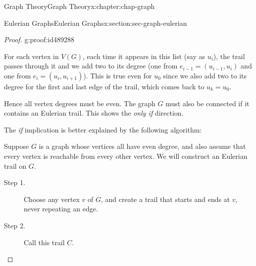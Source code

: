 \documentclass[oneside,10pt,]{book}
\numberwithin{equation}{section}
\begin{document}
\begin{chapterptx}{Graph Theory}{}{Graph Theory}{}{}{x:chapter:chap-graph}
\begin{sectionptx}{Eulerian Graphs}{}{Eulerian Graphs}{}{}{x:section:sec-graph-eulerian}
\begin{proof}{}{g:proof:id489288}
\begin{sidebyside}{1}{0.275}{0.275}{0}
\begin{sbspanel}{0.45}
{
}%
\end{sbspanel}%
\end{sidebyside}%
\par
For each vertex in \(V(G)\), each time it appears in this list (say as \(u_i\)), the trail passes through it and we add two to its degree (one from \(e_{i-1} = (u_{i-1},u_i)\) and one from \(e_i = (u_i,u_{i+1})\)). This is true even for \(u_0\) since we also add two to its degree for the first and last edge of the trail, which comes back to \(u_k = u_0\).%
\par
Hence all vertex degrees must be even. The graph \(G\) must also be connected if it contains an Eulerian trail. This shows the \emph{only if} direction.%
\par
The \emph{if} implication is better explained by the following algorithm:%
\par
Suppose \(G\) is a graph whose vertices all have even degree, and also assume that every vertex is reachable from every other vertex. We will construct an Eulerian trail on \(G\).%
\par
%
\begin{description}
\item[{Step 1.}]Choose any vertex \(v\) of \(G\), and create a trail that starts and ends at \(v\), never repeating an edge.%
\item[{Step 2.}]Call this trail \(C\).%

\end{description}
\end{proof}
\end{sectionptx}
\end{chapterptx}
\end{document}
